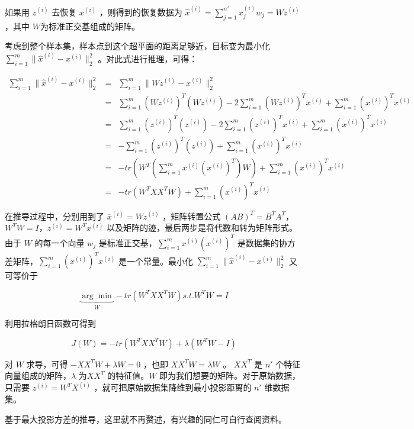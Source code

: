 如果用 $z^{(i)} $ 去恢复 $x^{(i)} $ ，则得到的恢复数据为 $\widehat{x}^{(i)} = \sum^{n'}_{j=1} x^{(i)}_j w_j = Wz^{(i)}$，其中 $W$为标准正交基组成的矩阵。

考虑到整个样本集，样本点到这个超平面的距离足够近，目标变为最小化 $\sum^m_{i=1} \| \hat{x}^{(i)} - x^{(i)} \|^2_2$ 。对此式进行推理，可得：

\begin{eqnarray*}
	\sum^m_{i=1} \| \hat{x}^{(i)} - x^{(i)} \|^2_2 &=& \sum^m_{i=1} \| Wz^{(i)} - x^{(i)} \|^2_2 \\
	&=& \sum^m_{i=1} \left( Wz^{(i)} \right)^T \left( Wz^{(i)} \right) - 2\sum^m_{i=1} \left( Wz^{(i)} \right)^T x^{(i)} + \sum^m_{i=1} \left( x^{(i)} \right)^T x^{(i)} \\
	&=& \sum^m_{i=1} \left( z^{(i)} \right)^T \left( z^{(i)} \right) - 2\sum^m_{i=1} \left( z^{(i)} \right)^T x^{(i)} + \sum^m_{i=1} \left( x^{(i)} \right)^T x^{(i)} \\
	&=& - \sum^m_{i=1} \left( z^{(i)} \right)^T \left( z^{(i)} \right) + \sum^m_{i=1} \left( x^{(i)} \right)^T x^{(i)} \\
	&=& -tr \left( W^T \left( \sum^m_{i=1} x^{(i)} \left( x^{(i)} \right)^T \right)W \right) + \sum^m_{i=1} \left( x^{(i)} \right)^T x^{(i)} \\
	&=& -tr \left( W^TXX^TW \right) + \sum^m_{i=1} \left( x^{(i)} \right)^T x^{(i)}
\end{eqnarray*}

在推导过程中，分别用到了 $\overline{x}^{(i)} = Wz^{(i)}$ ，矩阵转置公式 $(AB)^T = B^TA^T$，$W^TW = I$，$z^{(i)} = W^Tx^{(i)}$ 以及矩阵的迹，最后两步是将代数和转为矩阵形式。由于 $W$ 的每一个向量 $w_j$ 是标准正交基，$\sum^m_{i=1} x^{(i)} \left(  x^{(i)} \right)^T$ 是数据集的协方差矩阵，$\sum^m_{i=1} \left(  x^{(i)} \right)^T x^{(i)} $ 是一个常量。最小化 $\sum^m_{i=1} \| \hat{x}^{(i)} - x^{(i)} \|^2_2$ 又可等价于

$$
\underbrace{\arg \min}_W - tr \left( W^TXX^TW \right) s.t.W^TW = I
$$

利用拉格朗日函数可得到

$$
J(W) = -tr(W^TXX^TW) + \lambda(W^TW - I)
$$

对 $W$ 求导，可得 $-XX^TW + \lambda W = 0 $ ，也即 $ XX^TW = \lambda W $ 。 $ XX^T $ 是 $ n' $ 个特征向量组成的矩阵，$\lambda$ 为$ XX^T $ 的特征值。$W$ 即为我们想要的矩阵。对于原始数据，只需要 $z^{(i)} = W^TX^{(i)}$ ，就可把原始数据集降维到最小投影距离的 $n'$ 维数据集。

基于最大投影方差的推导，这里就不再赘述，有兴趣的同仁可自行查阅资料。

